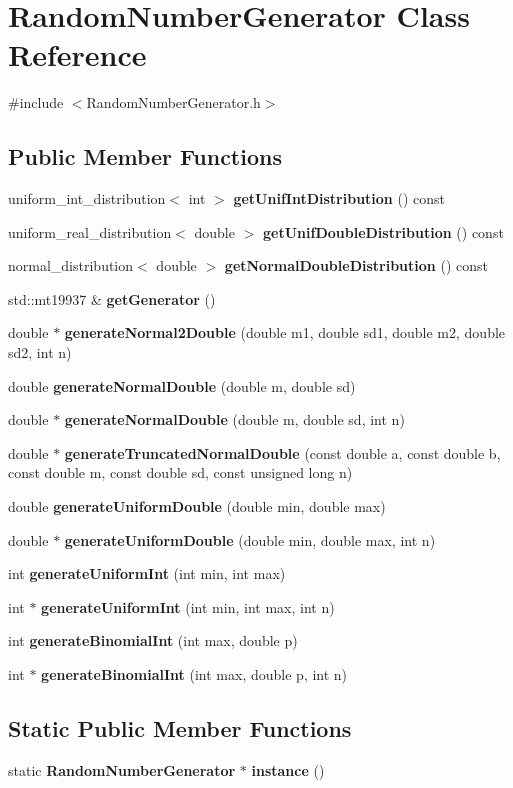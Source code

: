 \section{Random\+Number\+Generator Class Reference}
\label{class_random_number_generator}


{\ttfamily \#include $<$Random\+Number\+Generator.\+h$>$}

\subsection*{Public Member Functions}
\begin{DoxyCompactItemize}
\item 
uniform\+\_\+int\+\_\+distribution$<$ int $>$ \textbf{ get\+Unif\+Int\+Distribution} () const
\item 
uniform\+\_\+real\+\_\+distribution$<$ double $>$ \textbf{ get\+Unif\+Double\+Distribution} () const
\item 
normal\+\_\+distribution$<$ double $>$ \textbf{ get\+Normal\+Double\+Distribution} () const
\item 
std\+::mt19937 \& \textbf{ get\+Generator} ()
\item 
double $\ast$ \textbf{ generate\+Normal2\+Double} (double m1, double sd1, double m2, double sd2, int n)
\item 
double \textbf{ generate\+Normal\+Double} (double m, double sd)
\item 
double $\ast$ \textbf{ generate\+Normal\+Double} (double m, double sd, int n)
\item 
double $\ast$ \textbf{ generate\+Truncated\+Normal\+Double} (const double a, const double b, const double m, const double sd, const unsigned long n)
\item 
double \textbf{ generate\+Uniform\+Double} (double min, double max)
\item 
double $\ast$ \textbf{ generate\+Uniform\+Double} (double min, double max, int n)
\item 
int \textbf{ generate\+Uniform\+Int} (int min, int max)
\item 
int $\ast$ \textbf{ generate\+Uniform\+Int} (int min, int max, int n)
\item 
int \textbf{ generate\+Binomial\+Int} (int max, double p)
\item 
int $\ast$ \textbf{ generate\+Binomial\+Int} (int max, double p, int n)
\end{DoxyCompactItemize}
\subsection*{Static Public Member Functions}
\begin{DoxyCompactItemize}
\item 
static \textbf{ Random\+Number\+Generator} $\ast$ \textbf{ instance} ()
\end{DoxyCompactItemize}
